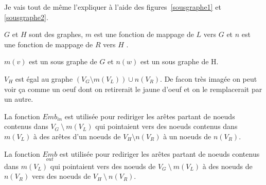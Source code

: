 \documentclass[a4paper, 12pt]{article}
\begin{document}
  Je vais tout de même l'expliquer à l'aide des figures~\ref{sousgraphe1} et \ref{sousgraphe2}.

  \(G\) et \(H\) sont des graphes, \(m\) est une fonction de mappage de \(L\) vers \(G\) et \(n\) est une fonction de mappage de \(R\)  vers \(H\) .

  \(m(v)\) est un sous graphe de \(G\) et \(n(w)\) est un sous graphe de H.

  {$V_H$} est égal au graphe \(({V_G} \setminus m({V_L})) \cup n({V_R})\). De facon très imagée on peut voir ça comme un oeuf dont on retirerait le jaune d'oeuf et on le remplacerait par un autre.

  La fonction $Emb_{in}$ est utilisée pour rediriger les arêtes partant de noeuds contenus dans \( {V_G}~\setminus~m({V_L}) \)
  qui pointaient vers des noeuds contenus dans \( m({V_L}) \) à des arêtes d'un noeuds de \( {V_H} \setminus n({V_R}) \) à un noeuds de \( n({V_R}) \).

  La fonction $\underset{out}{Emb}$ est utilisée pour rediriger les arêtes partant de noeuds contenus dans \( m({V_L}) \)
  qui pointaient vers des noeuds de \( {V_G}~\setminus~m({V_L}) \) à des noeuds de \(n({V_R}) \) vers des noeuds de \( {V_H}~\setminus~n({V_R}) \).
\end{document}
